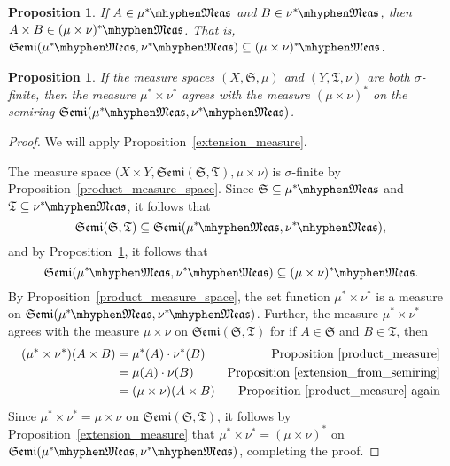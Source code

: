 \documentclass[
twoside=true,
paper=letter,
fontsize=9pt,
pagesize=auto,
leqno,
openany,
headsepline,
overfullrule,
]{scrbook}
\theoremstyle{plain}
\theoremstyle{plain}
\newtheorem{prop}[thm]{Proposition}
\theoremstyle{definition}
\theoremstyle{bfnoteitalic}
\theoremstyle{bfnoteroman}
\newcommand{\sigalg}[1]{\mathfrak{#1}}
\newcommand{\textsigma}{\hbox{\large{$\sigma$}}\kern-1pt}
\newcommand{\semiring}{\sigalg{S}}
\newcommand{\semiringii}{\sigalg{T}}
\newcommand{\productsemiring}[2]{\mathfrak{Semi}(#1,#2)}
\newcommand{\measurable}[1]{{#1}\mhyphen\mathfrak{Meas}}
\newcommand{\kernast}{\ast\kern-1pt}
\newcommand{\measurespace}{X}
\newcommand{\measurespaceii}{Y}
\newcommand{\measure}{\mu}
\newcommand{\measureii}{\nu}
\newcommand{\seti}{A}
\newcommand{\setii}{B}
\begin{document}
\begin{prop}\label{semiring_inclusion}
If
$\seti\in\measurable{\measure^\kernast}$ and 
$\setii\in\measurable{\measureii^\kernast}$, then
$\seti\times\setii \in \measurable{(\measure\times\measureii)^\kernast}$.  
That is,
$\productsemiring{\measurable{\measure^\kernast}}{\measurable{\measureii^\kernast}}
\subseteq
\measurable{(\measure\times\measureii)^\kernast}$.
\end{prop}


\begin{prop}\label{agreeable_product_measures}
If the measure spaces
$(\measurespace, \semiring, \measure)$
and
$(\measurespaceii, \semiringii, \measureii)$ 
are both \textsigma\hyp{}finite, then the measure
$\measure^*\times\measureii^*$ agrees with the measure
$(\measure\times\measureii)^*$ on the semiring
$\productsemiring{\measurable{\measure^\kernast}}{\measurable{\measureii^\kernast}}$.
\end{prop}

\begin{proof}
We will apply Proposition~\ref{extension_measure}.

The measure space  
$\bigl(\measurespace\times\measurespaceii, 
\productsemiring{\semiring}{\semiringii}, 
\measure\times\measureii\bigr)$ is \textsigma\hyp{}finite by Proposition~\ref{product_measure_space}.
Since
$\semiring\subseteq \measurable{\measure^\kernast}$
and
$\semiringii\subseteq \measurable{\measureii^\kernast}$, it follows that
\[
\productsemiring{\semiring}{\semiringii}
\subseteq
\productsemiring{\measurable{\measure^\kernast}}{\measurable{\measureii^\kernast}},
\]
and by Proposition~\ref{semiring_inclusion}, it follows that
\[
\productsemiring{\measurable{\measure^\kernast}}{\measurable{\measureii^\kernast}}
\subseteq
\measurable{(\measure\times\measureii)^\kernast}.
\]
By Proposition~\ref{product_measure_space}, the set function 
$\measure^*\times\measureii^*$
is a measure on 
$\productsemiring{\measurable{\measure^\kernast}}{\measurable{\measureii^\kernast}}$.
Further, the measure 
$\measure^*\times\measureii^*$
agrees with the measure
$\measure\times\measureii$ on 
$\productsemiring{\semiring}{\semiringii}$ for if 
$\seti\in\semiring$ and $\setii\in\semiringii$, then 
\begin{align*}
(\measure^*\times\measureii^*)(\seti\times\setii)
& = \measure^*(\seti)\cdot\measureii^*(\setii)
&\text{Proposition~\ref{product_measure}} 
\\
& = \measure(\seti)\cdot\measureii(\setii)
&\text{Proposition~\ref{extension_from_semiring}}
\\
& =(\measure\times\measureii)(\seti\times\setii)
&\text{Proposition~\ref{product_measure} again}
\\
\end{align*}
Since  
$\measure^*\times\measureii^*
=
\measure\times\measureii$ on 
$\productsemiring{\semiring}{\semiringii}$, 
it follows by Proposition~\ref{extension_measure} that 
$\measure^*\times\measureii^*
=
(\measure\times\measureii)^*$ on
$\productsemiring{\measurable{\measure^\kernast}}{\measurable{\measureii^\kernast}}$,
completing the proof. 
\end{proof}
\end{document}
